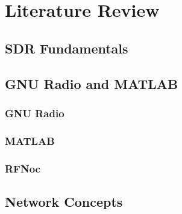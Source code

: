 
\chapter{Literature Review} %

\label{Chapter2} %




\section{SDR Fundamentals}


\section{GNU Radio and MATLAB}

\subsection{GNU Radio}

\subsection{MATLAB}

\subsection{RFNoc}


\section{Network Concepts}

